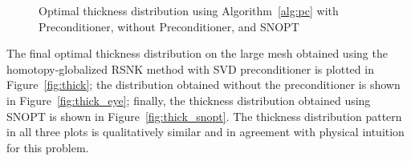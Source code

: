 \begin{figure}[tbp]
  \centering
  \hspace{1em}
  \hspace{1em}
    \caption{Optimal thickness distribution using Algorithm~\ref{alg:pc} with Preconditioner, without Preconditioner, and SNOPT \label{fig:thick3}}
\end{figure}



    
The final optimal thickness distribution on the large mesh obtained using the homotopy-globalized RSNK method with SVD preconditioner is plotted in Figure~\ref{fig:thick}; the distribution obtained without the preconditioner is shown in Figure~\ref{fig:thick_eye}; finally, the thickness distribution obtained using SNOPT is shown in Figure~\ref{fig:thick_snopt}. 
The thickness distribution pattern in all three plots is qualitatively similar and in agreement with physical
intuition for this problem. 

